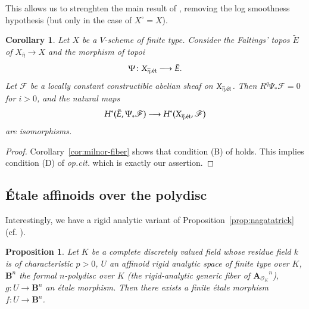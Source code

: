 \documentclass[twoside]{amsart}
\renewcommand{\AA}{\mathbf{A}}
\newcommand{\BB}{\mathbf{B}}
\newcommand{\Ff}{\mathscr{F}}
\newcommand{\Oo}{\mathscr{O}}
\newcommand{\et}{{\rm\acute{e}t}}
\newcommand{\ANK}[2]{{\AA_{#2}}^{\! \! \! \!  #1}} %
\renewcommand{\to}{\longrightarrow}
\renewcommand{\bar}{\overline}
\theoremstyle{plain}
\newtheorem{proposition}[subsubsection]{Proposition}
\newtheorem{corollary}[subsubsection]{Corollary}
\theoremstyle{definition}
\theoremstyle{remark}
\numberwithin{equation}{subsection}
\begin{document}
This allows us to strenghten the main result of \cite{Achinger}, removing the log smoothness hypothesis (but only in the case of $X^\circ = X$).

\begin{corollary} \label{cor:better-achinger}
	Let $X$ be a $V$-scheme of finite type. Consider the Faltings' topos $\tilde E$ of $X_{\bar\eta}\to X$ and the morphism of topoi
	\[ 
		\Psi \colon X_{\bar\eta,\et} \to \tilde E.
	\]
	Let $\Ff$ be a locally constant constructible abelian sheaf on $X_{\bar\eta,\et}$. Then $R^q\Psi_* \Ff = 0$ for $i>0$, and the natural maps
	\[ 
		H^*(\tilde E, \Psi_* \Ff)\to H^*(X_{\bar\eta,\et}, \Ff)
	\]
	are isomorphisms.
\end{corollary}

\begin{proof}
	Corollary~\ref{cor:milnor-fiber} shows that condition (B) of \cite[\S 1.2]{Achinger} holds. This implies condition (D) of \emph{op.cit.} which is exactly our assertion.
\end{proof}

\subsection{\'Etale affinoids over the polydisc}
\label{ss:nagata-rigid}

Interestingly, we have a rigid analytic variant of Proposition~\ref{prop:nagatatrick} (cf. \cite[Proposition~5.10]{Achinger}). 

\begin{proposition} \label{prop:nagata-rigid}
	Let $K$ be a complete discretely valued field whose residue field $k$ is of characteristic $p>0$, $U$ an affinoid rigid analytic space of finite type over $K$, $\BB^n$ the formal $n$-polydisc over $K$ (the rigid-analytic generic fiber of $\ANK{n}{\Oo_K}$),  $g\colon U\to \BB^n$ an \'etale morphism. Then there exists a finite \'etale morphism $f\colon U\to \BB^n$.
\end{proposition}
\end{document}
